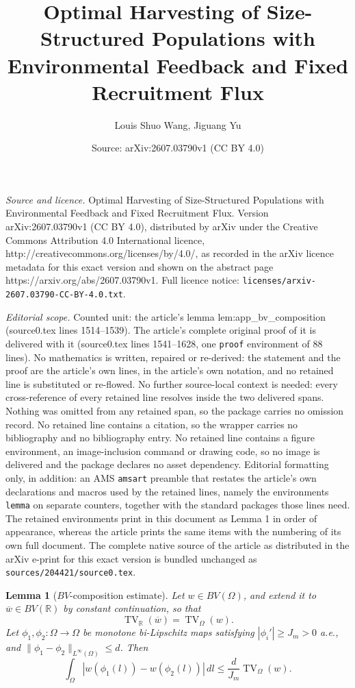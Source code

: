 \documentclass[10pt,a4paper]{amsart}
\title{Optimal Harvesting of Size-Structured Populations with Environmental Feedback and Fixed Recruitment Flux}
\author{Louis Shuo Wang, Jiguang Yu}
\date{Source: arXiv:2607.03790v1 (CC BY 4.0)}
\newtheorem{lemma}{Lemma}
\begin{document}
\maketitle

\noindent\emph{Source and licence.} Optimal Harvesting of Size-Structured Populations with Environmental Feedback and Fixed Recruitment Flux. Version arXiv:2607.03790v1 (CC BY 4.0), distributed by arXiv under the Creative Commons Attribution 4.0 International licence, http://creativecommons.org/licenses/by/4.0/, as recorded in the arXiv licence metadata for this exact version and shown on the abstract page https://arxiv.org/abs/2607.03790v1. Full licence notice: \texttt{licenses/arxiv-2607.03790-CC-BY-4.0.txt}.\par\smallskip

\noindent\textit{Editorial scope.} Counted unit: the article's lemma lem:app\_bv\_composition (source0.tex lines 1514--1539). The article's complete original proof of it is delivered with it (source0.tex lines 1541--1628, one \texttt{proof} environment of 88 lines). No mathematics is written, repaired or re-derived: the statement and the proof are the article's own lines, in the article's own notation, and no retained line is substituted or re-flowed.  No further source-local context is needed: every cross-reference of every retained line resolves inside the two delivered spans.  Nothing was omitted from any retained span, so the package carries no omission record.  No retained line contains a citation, so the wrapper carries no bibliography and no bibliography entry.  No retained line contains a figure environment, an image-inclusion command or drawing code, so no image is delivered and the package declares no asset dependency.  Editorial formatting only, in addition: an AMS \texttt{amsart} preamble that restates the article's own declarations and macros used by the retained lines, namely the environments \texttt{lemma} on separate counters, together with the standard packages those lines need.  The retained environments print in this document as Lemma 1 in order of appearance, whereas the article prints the same items with the numbering of its own full document.  The complete native source of the article as distributed in the arXiv e-print for this exact version is bundled unchanged as \texttt{sources/204421/source0.tex}.
\begin{lemma}[\(BV\)-composition estimate]
\label{lem:app_bv_composition}
Let \(w\in BV(\Omega)\), and extend it to
\(\overline w\in BV(\mathbb R)\) by constant continuation,
so that
\[
\operatorname{TV}_{\mathbb R}(\overline w)
=
\operatorname{TV}_{\Omega}(w).
\]
Let
\(\phi_1,\phi_2:\Omega\to\Omega\)
be monotone bi-Lipschitz maps satisfying
$|\phi_i'|\ge J_m>0$ a.e., and
$\|\phi_1-\phi_2\|_{L^\infty(\Omega)}
\le d$.
Then
\[
\int_\Omega
|w(\phi_1(l))-w(\phi_2(l))|
\,dl
\le
\frac{d}{J_m}
\operatorname{TV}_\Omega(w).
\]
\end{lemma}
\end{document}
